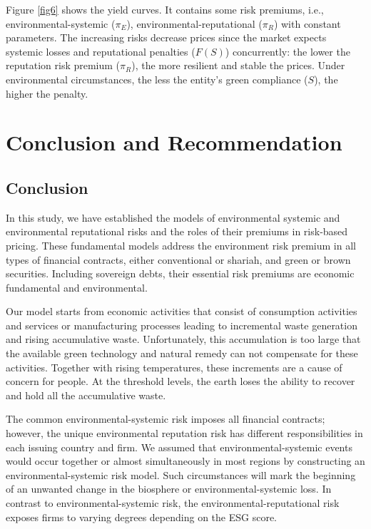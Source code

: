 \documentclass[sn-basic]{sn-jnl}%
\theoremstyle{thmstyleone}%
\theoremstyle{thmstyletwo}%
\theoremstyle{thmstylethree}%
\begin{document}
Figure \ref{fig6} shows the yield curves. It contains some risk premiums, i.e., environmental-systemic ($\pi_{E}$), environmental-reputational ($\pi_{R}$) with constant parameters. The increasing risks decrease prices since the market expects systemic losses and reputational penalties ($F\left(S\right)$) concurrently: the lower the reputation risk premium ($\pi_{R}$), the more resilient and stable the prices. Under environmental circumstances, the less the entity’s green compliance ($S$), the higher the penalty.

\section{Conclusion and Recommendation}
\subsection{Conclusion}
In this study, we have established the models of environmental systemic and environmental reputational risks and the roles of their premiums in risk-based pricing. These fundamental models address the environment risk premium in all types of financial contracts, either conventional or shariah, and green or brown securities. Including sovereign debts, their essential risk premiums are economic fundamental and environmental.

Our model starts from economic activities that consist of consumption activities and services or manufacturing processes leading to incremental waste generation and rising accumulative waste. Unfortunately, this accumulation is too large that the available green technology and natural remedy can not compensate for these activities. Together with rising temperatures, these increments are a cause of concern for people. At the threshold levels, the earth loses the ability to recover and hold all the accumulative waste.

The common environmental-systemic risk imposes all financial contracts; however, the unique environmental reputation risk has different responsibilities in each issuing country and firm. We assumed that environmental-systemic events would occur together or almost simultaneously in most regions by constructing an environmental-systemic risk model. Such circumstances will mark the beginning of an unwanted change in the biosphere or environmental-systemic loss. In contrast to environmental-systemic risk, the environmental-reputational risk exposes firms to varying degrees depending on the ESG score.
\end{document}
